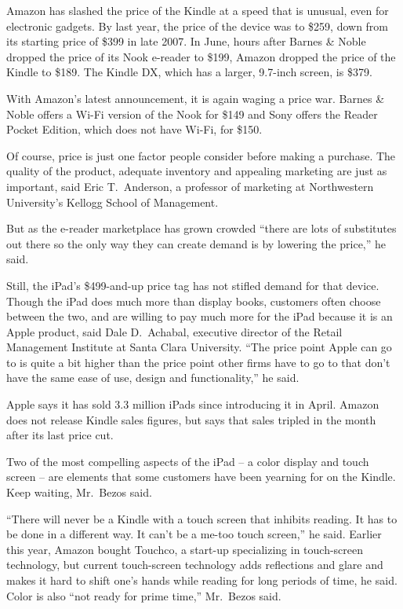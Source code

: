﻿\documentclass[12pt]{article}
\begin{document}
Amazon has slashed the price of the Kindle at a speed that is unusual, even for electronic gadgets.
By last year, the price of the device was to \$259, down from its starting price of \$399 in late
2007. In June, hours after Barnes \& Noble dropped the price of its Nook e-reader to \$199, Amazon
dropped the price of the Kindle to \$189. The Kindle DX, which has a larger, 9.7-inch screen, is
\$379.

With Amazon's latest announcement, it is again waging a price war. Barnes \& Noble offers a Wi-Fi
version of the Nook for \$149 and Sony offers the Reader Pocket Edition, which does not have Wi-Fi,
for \$150.

Of course, price is just one factor people consider before making a purchase. The quality of the
product, adequate inventory and appealing marketing are just as important, said Eric T.~Anderson, a
professor of marketing at Northwestern University's Kellogg School of Management.

But as the e-reader marketplace has grown crowded ``there are lots of substitutes out there so the
only way they can create demand is by lowering the price,'' he said.

Still, the iPad's \$499-and-up price tag has not stifled demand for that device. Though the iPad
does much more than display books, customers often choose between the two, and are willing to pay
much more for the iPad because it is an Apple product, said Dale D.~Achabal, executive director of
the Retail Management Institute at Santa Clara University. ``The price point Apple can go to is
quite a bit higher than the price point other firms have to go to that don't have the same ease of
use, design and functionality,'' he said.

Apple says it has sold 3.3 million iPads since introducing it in April. Amazon does not release
Kindle sales figures, but says that sales tripled in the month after its last price cut.

Two of the most compelling aspects of the iPad -- a color display and touch screen -- are elements
that some customers have been yearning for on the Kindle. Keep waiting, Mr.~Bezos said.

``There will never be a Kindle with a touch screen that inhibits reading. It has to be done in a
different way. It can't be a me-too touch screen,'' he said. Earlier this year, Amazon bought
Touchco, a start-up specializing in touch-screen technology, but current touch-screen technology
adds reflections and glare and makes it hard to shift one's hands while reading for long periods of
time, he said. Color is also ``not ready for prime time,'' Mr.~Bezos said.
\end{document}
